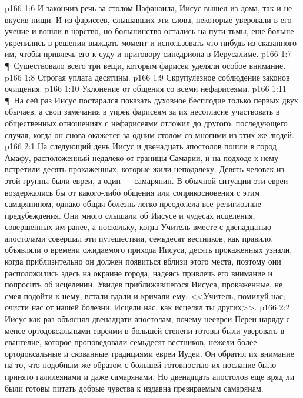 \vs p166 1:6 И закончив речь за столом Нафанаила, Иисус вышел из дома, так и не вкусив пищи. И из фарисеев, слышавших эти слова, некоторые уверовали в его учение и вошли в царство, но большинство остались на пути тьмы, еще больше укрепились в решении выждать момент и использовать что\hyp{}нибудь из сказанного им, чтобы привлечь его к суду и приговору синедриона в Иерусалиме.
\vs p166 1:7 \P\ Существовало всего три вещи, которым фарисеи уделяли особое внимание.
\vs p166 1:8 \bibnobreakspace Строгая уплата десятины.
\vs p166 1:9 \bibnobreakspace Скрупулезное соблюдение законов очищения.
\vs p166 1:10 \bibnobreakspace Уклонение от общения со всеми нефарисеями.
\vs p166 1:11 \P\ На сей раз Иисус постарался показать духовное бесплодие только первых двух обычаев, а свои замечания в упрек фарисеям за их несогласие участвовать в общественных отношениях с нефарисеями отложил до другого, последующего случая, когда он снова окажется за одним столом со многими из этих же людей.
\vs p166 2:1 На следующий день Иисус и двенадцать апостолов пошли в город Амафу, расположенный недалеко от границы Самарии, и на подходе к нему встретили десять прокаженных, которые жили неподалеку. Девять человек из этой группы были евреи, а один --- самарянин. В обычной ситуации эти евреи воздержались бы от какого\hyp{}либо общения или соприкосновения с этим самарянином, однако общая болезнь легко преодолела все религиозные предубеждения. Они много слышали об Иисусе и чудесах исцеления, совершенных им ранее, а поскольку, когда Учитель вместе с двенадцатью апостолами совершал эти путешествия, семьдесят вестников, как правило, объявляли о времени ожидаемого прихода Иисуса, десять прокаженных узнали, когда приблизительно он должен появиться вблизи этого места, поэтому они расположились здесь на окраине города, надеясь привлечь его внимание и попросить об исцелении. Увидев приближавшегося Иисуса, прокаженные, не смея подойти к нему, встали вдали и кричали ему: <<Учитель, помилуй нас; очисти нас от нашей болезни. Исцели нас, как исцелял ты других>>.
\vs p166 2:2 Иисус как раз объяснял двенадцати апостолам, почему неевреи Переи наряду с менее ортодоксальными евреями в большей степени готовы были уверовать в евангелие, которое проповедовали семьдесят вестников, нежели более ортодоксальные и скованные традициями евреи Иудеи. Он обратил их внимание на то, что подобным же образом с большей готовностью их послание было принято галилеянами и даже самарянами. Но двенадцать апостолов еще вряд ли были готовы питать добрые чувства к издавна презираемым самарянам.
